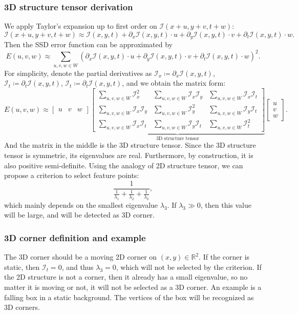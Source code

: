 \subsubsection{3D structure tensor derivation}
We apply Taylor's expansion up to first order on \(\mathcal{I}(x+u,y+v,t+w)\):
\[ \mathcal{I}(x+u,y+v,t+w)\approx\mathcal{I}(x,y,t)+\partial_x\mathcal{I}(x,y,t)\cdot u+\partial_y\mathcal{I}(x,y,t)\cdot v+\partial_t\mathcal{I}(x,y,t)\cdot w. \]
Then the SSD error function can be approximated by
\[ E(u,v,w)\approx\sum_{u,v,w\in W}\left(\partial_x\mathcal{I}(x,y,t)\cdot u+\partial_y\mathcal{I}(x,y,t)\cdot v+\partial_t\mathcal{I}(x,y,t)\cdot w\right)^2. \]
For simplicity, denote the partial derivatives as \(\mathcal{I}_x\coloneqq\partial_x\mathcal{I}(x,y,t)\), \(\mathcal{I}_t\coloneqq\partial_t\mathcal{I}(x,y,t)\), \(\mathcal{I}_t\coloneqq\partial_t\mathcal{I}(x,y,t)\), and we obtain the matrix form:
\[ E(u,v,w)\approx\begin{bmatrix} u & v & w \end{bmatrix} \underbrace{\begin{bmatrix} \sum_{u,v,w\in W}\mathcal{I}_x^2 & \sum_{u,v,w\in W}\mathcal{I}_x\mathcal{I}_y & \sum_{u,v,w\in W}\mathcal{I}_x\mathcal{I}_t \\ \sum_{u,v,w\in W}\mathcal{I}_x\mathcal{I}_y & \sum_{u,v,w\in W}\mathcal{I}_y^2 & \sum_{u,v,w\in W}\mathcal{I}_y\mathcal{I}_t \\ \sum_{u,v,w\in W}\mathcal{I}_x\mathcal{I}_t & \sum_{u,v,w\in W}\mathcal{I}_y\mathcal{I}_t & \sum_{u,v,w\in W}\mathcal{I}_t^2 \end{bmatrix}}_\text{3D structure tensor} \begin{bmatrix} u \\ v \\ w \end{bmatrix}. \]
And the matrix in the middle is the 3D structure tensor.
Since the 3D structure tensor is symmetric, its eigenvalues are real.
Furthermore, by construction, it is also positive semi-definite.
Using the analogy of 2D structure tensor, we can propose a criterion to select feature points:
\[ \frac{1}{\frac{1}{\lambda_1}+\frac{1}{\lambda_2}+\frac{1}{\lambda_3}}, \]
which mainly depends on the smallest eigenvalue \(\lambda_3\).
If \(\lambda_3\gg0\), then this value will be large, and will be detected as 3D corner.

\subsubsection{3D corner definition and example}
The 3D corner should be a moving 2D corner on \((x,y)\in\mathbb{R}^2\).
If the corner is static, then \(\mathcal{I}_t=0\), and thus \(\lambda_3=0\), which will not be selected by the criterion.
If the 2D structure is not a corner, then it already has a small eigenvalue, so no matter it is moving or not, it will not be selected as a 3D corner.
An example is a falling box in a static background.
The vertices of the box will be recognized as 3D corners.


